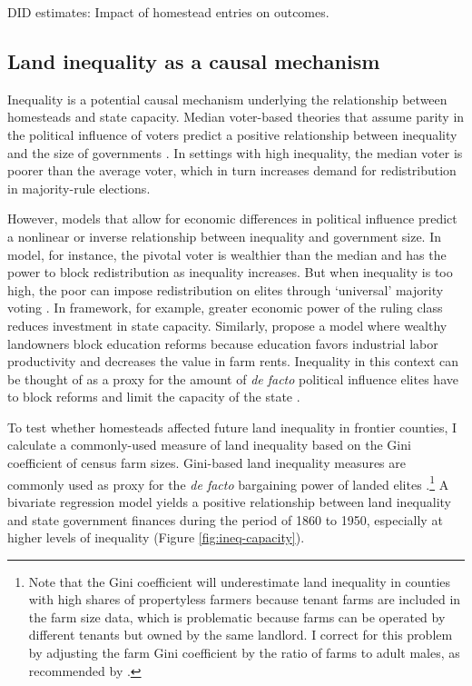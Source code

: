 \begin{table}[htbp]
	\begin{center}
		\caption{DID estimates: Impact of homestead entries on outcomes. \label{dd-estimates}}
		\resizebox{.9\width}{!}{}
	\end{center}
\end{table}

\subsection{Land inequality as a causal mechanism}  \label{mechanisms}

Inequality is a potential causal mechanism underlying the relationship between homesteads and state capacity. Median voter-based theories that assume parity in the political influence of voters predict a positive relationship between inequality and the size of governments \citep{meltzer1981rational}. In settings with high inequality, the median voter is poorer than the average voter, which in turn increases demand for redistribution in majority-rule elections. 

However, models that allow for economic differences in political influence predict a nonlinear or inverse relationship between inequality and government size. In  model, for instance, the pivotal voter is wealthier than the median and has the power to block redistribution as inequality increases. But when inequality is too high, the poor can impose redistribution on elites through `universal' majority voting \citep{perotti1993political,saint1993education}. In  framework, for example, greater economic power of the ruling class reduces investment in state capacity. Similarly, \citet{galor2009inequality} propose a model where wealthy landowners block education reforms because education favors industrial labor productivity and decreases the value in farm rents. Inequality in this context can be thought of as a proxy for the amount of \emph{de facto} political influence elites have to block reforms and limit the capacity of the state \citep{acemoglu2008persistence}. 

To test whether homesteads affected future land inequality in frontier counties, I calculate a commonly-used measure of land inequality based on the Gini coefficient of census farm sizes. Gini-based land inequality measures are commonly used as proxy for the \emph{de facto} bargaining power of landed elites \citep[e.g.,][]{boix2003democracy,ziblatt2008does,ansell2015}.\footnote{Note that the Gini coefficient will underestimate land inequality in counties with high shares of propertyless farmers because tenant farms are included in the farm size data, which is problematic because farms can be operated by different tenants but owned by the same landlord. I correct for this problem by adjusting the farm Gini coefficient by the ratio of farms to adult males, as recommended by \citet{vollrath2013inequality}.} A bivariate regression model yields a positive relationship between land inequality and state government finances during the period of 1860 to 1950, especially at higher levels of inequality (Figure \ref{fig:ineq-capacity}). 

